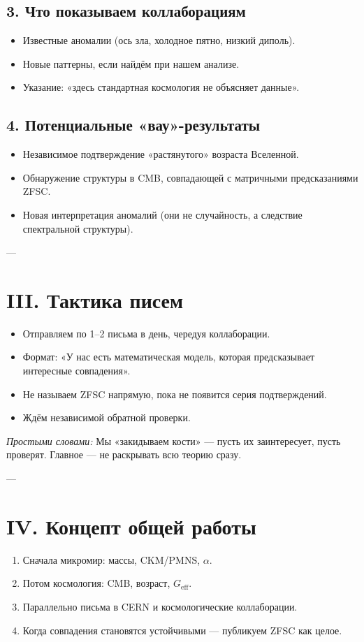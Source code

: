\documentclass[a4paper,12pt]{article}
\begin{document}
\subsection*{3. Что показываем коллаборациям}
\begin{itemize}
  \item Известные аномалии (ось зла, холодное пятно, низкий диполь).  
  \item Новые паттерны, если найдём при нашем анализе.  
  \item Указание: «здесь стандартная космология не объясняет данные».
\end{itemize}

\subsection*{4. Потенциальные «вау»-результаты}
\begin{itemize}
  \item Независимое подтверждение «растянутого» возраста Вселенной.  
  \item Обнаружение структуры в CMB, совпадающей с матричными предсказаниями ZFSC.  
  \item Новая интерпретация аномалий (они не случайность, а следствие спектральной структуры).
\end{itemize}

---

\section*{III. Тактика писем}
\begin{itemize}
  \item Отправляем по 1--2 письма в день, чередуя коллаборации.  
  \item Формат: «У нас есть математическая модель, которая предсказывает интересные совпадения».  
  \item Не называем ZFSC напрямую, пока не появится серия подтверждений.  
  \item Ждём независимой обратной проверки.
\end{itemize}

\textit{Простыми словами:}  
Мы «закидываем кости» — пусть их заинтересует, пусть проверят.  
Главное — не раскрывать всю теорию сразу.

---

\section*{IV. Концепт общей работы}
\begin{enumerate}
  \item Сначала микромир: массы, CKM/PMNS, $\alpha$.  
  \item Потом космология: CMB, возраст, $G_{\text{eff}}$.  
  \item Параллельно письма в CERN и космологические коллаборации.  
  \item Когда совпадения становятся устойчивыми — публикуем ZFSC как целое.
\end{enumerate}
\end{document}
